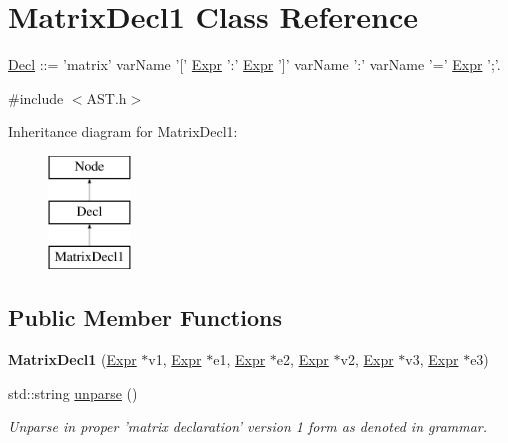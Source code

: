 \hypertarget{classMatrixDecl1}{\section{Matrix\-Decl1 Class Reference}
\label{classMatrixDecl1}
}


\hyperlink{classDecl}{Decl} \-:\-:= 'matrix' var\-Name '\mbox{[}' \hyperlink{classExpr}{Expr} '\-:' \hyperlink{classExpr}{Expr} '\mbox{]}' var\-Name '\-:' var\-Name '=' \hyperlink{classExpr}{Expr} ';'.  




{\ttfamily \#include $<$A\-S\-T.\-h$>$}

Inheritance diagram for Matrix\-Decl1\-:\begin{figure}[H]
\begin{center}
\leavevmode
\includegraphics[height=3.000000cm]{classMatrixDecl1}
\end{center}
\end{figure}
\subsection*{Public Member Functions}
\begin{DoxyCompactItemize}
\item 
\hypertarget{classMatrixDecl1_a863346bc697d7ca06262e80c7b3a48bd}{{\bfseries Matrix\-Decl1} (\hyperlink{classExpr}{Expr} $\ast$v1, \hyperlink{classExpr}{Expr} $\ast$e1, \hyperlink{classExpr}{Expr} $\ast$e2, \hyperlink{classExpr}{Expr} $\ast$v2, \hyperlink{classExpr}{Expr} $\ast$v3, \hyperlink{classExpr}{Expr} $\ast$e3)}\label{classMatrixDecl1_a863346bc697d7ca06262e80c7b3a48bd}

\item 
\hypertarget{classMatrixDecl1_a01beb5e497f7752612d396d3ca3f7bca}{std\-::string \hyperlink{classMatrixDecl1_a01beb5e497f7752612d396d3ca3f7bca}{unparse} ()}\label{classMatrixDecl1_a01beb5e497f7752612d396d3ca3f7bca}

\begin{DoxyCompactList}\small\item\em Unparse in proper 'matrix declaration' version 1 form as denoted in grammar. \end{DoxyCompactList}\end{DoxyCompactItemize}


